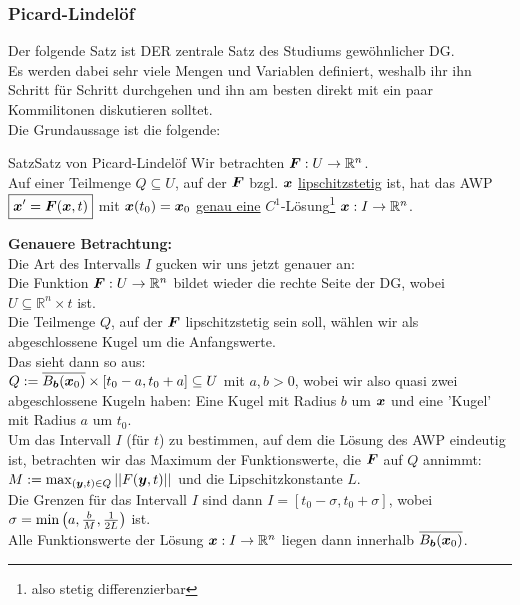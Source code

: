\subsubsection{Picard-Lindelöf}
Der folgende Satz ist DER zentrale Satz des Studiums gewöhnlicher DG.\\
Es werden dabei sehr viele Mengen und Variablen definiert, weshalb ihr ihn Schritt für Schritt durchgehen und ihn am besten direkt mit ein paar Kommilitonen diskutieren solltet.\\
Die Grundaussage ist die folgende:
\begin{Satz}
{Satz}{Satz von Picard-Lindelöf}
Wir betrachten ${{\text{\boldmath${F}$}}}:U\to\mathbb{R}^n$.\\
Auf einer Teilmenge $Q\subseteq U$, auf der ${{\text{\boldmath${F}$}}}$ bzgl. ${{\text{\boldmath${x}$}}}$ \underline{lipschitzstetig} ist, hat das AWP $\boxed{{{\text{\boldmath${x}$}}}'={{\text{\boldmath${F}$}}}({{\text{\boldmath${x}$}}},t)}$ mit ${{\text{\boldmath${x}$}}}(t_0)={{\text{\boldmath${x}$}}}_0$ \underline{genau eine} $C^1$-Lösung\footnote{also stetig differenzierbar} ${{\text{\boldmath${x}$}}}:I\to\mathbb{R}^n$.
\end{Satz}
\textbf{Genauere Betrachtung:}\\
Die Art des Intervalls $I$ gucken wir uns jetzt genauer an:\\
Die Funktion ${{\text{\boldmath${F}$}}}:U\to\mathbb{R}^n$ bildet wieder die rechte Seite der DG, wobei $U\subseteq \mathbb{R}^n\times t$ ist.\\
Die Teilmenge $Q$, auf der ${{\text{\boldmath${F}$}}}$ lipschitzstetig sein soll, wählen wir als abgeschlossene Kugel um die Anfangswerte.\\
Das sieht dann so aus:\\ $Q:=\overline{B_{{\text{\boldmath${b}$}}}({{\text{\boldmath${x}$}}}_0)}\times[t_0-a,t_0+a]\subseteq U$ mit $a,b>0$, wobei wir also quasi zwei abgeschlossene Kugeln haben: Eine Kugel mit Radius $b$ um ${{\text{\boldmath${x}$}}}$ und eine 'Kugel' mit Radius $a$ um $t_0$.\\
Um das Intervall $I$ (für $t$) zu bestimmen, auf dem die Lösung des AWP eindeutig ist, betrachten wir das Maximum der Funktionswerte, die ${{\text{\boldmath${F}$}}}$ auf $Q$ annimmt:\\
$M:=\max_{({{\text{\boldmath${y}$}}}, t)\in Q}\left|\left|F({{\text{\boldmath${y}$}}},t)\right|\right|$ und die Lipschitzkonstante $L$.\\
Die Grenzen für das Intervall $I$ sind dann $I=[t_0-\sigma, t_0+\sigma]$, wobei $\sigma=\min\left({a,\frac{b}{M},\frac{1}{2L}}\right)$ ist.\\
Alle Funktionswerte der Lösung ${{\text{\boldmath${x}$}}}:I\to\mathbb{R}^n$ liegen dann innerhalb $\overline{B_{{\text{\boldmath${b}$}}}({{\text{\boldmath${x}$}}}_0)}$.\\
